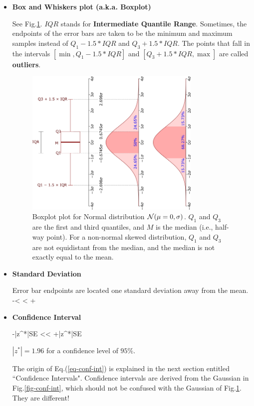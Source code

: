 \begin{itemize}
\item{\bf Box and Whiskers plot (a.k.a. Boxplot)}

See Fig.\ref{fig-boxplot}.
$IQR$ stands for {\bf
Intermediate Quantile Range}.
Sometimes, the endpoints of the
error bars are taken to be the minimum and maximum samples
instead of $Q_1- 1.5 *IQR$ and $Q_3+ 1.5 *IQR$.
The points that fall
in the intervals $[\min,Q_1- 1.5* IQR]$
and $[Q_3+ 1.5 *IQR, \max]$
are
called {\bf outliers}.
\begin{figure}[h!]
\centering
\includegraphics[width=3.3in]
{conventions/Boxplot.png}
\caption{Boxplot plot for Normal
distribution ${\cal N}(\mu=0,\sigma)$.
$Q_1$ and $Q_3$ are the first and third
quantiles, and $M$ is the median (i.e., half-way point).
For a non-normal skewed
distribution, $Q_1$ and $Q_3$
are not equidistant from the median, and the
median is not exactly equal to the mean. }
 \label{fig-boxplot}
\end{figure}



\item{\bf Standard Deviation}

Error bar endpoints are located one standard deviation
away from the mean.
\beq
\mu-\s< \mu < \mu+\s
\eeq

\item{\bf Confidence Interval}

\beq
\mu-|z^*|SE <\mu < \mu+|z^*|SE
\label{eq-conf-int}
\eeq

$|z^*|=1.96$ for a confidence level of $95\%$.

The origin of Eq.(\ref{eq-conf-int})
is explained in the next section entitled ``Confidence Intervals".
Confidence intervals are
derived from the Gaussian in Fig.\ref{fig-conf-int},
which should not be confused with the
Gaussian of Fig.\ref{fig-boxplot}.
They are different!

\end{itemize}
